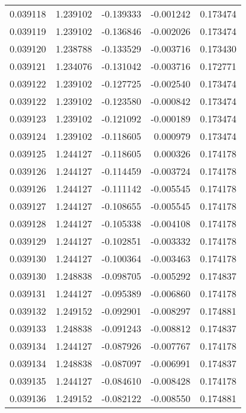 \begin{tabular}{lrrrr}
0.039118    &  1.239102 & -0.139333 & -0.001242 &             0.173474 \\
0.039119    &  1.239102 & -0.136846 & -0.002026 &             0.173474 \\
0.039120    &  1.238788 & -0.133529 & -0.003716 &             0.173430 \\
0.039121    &  1.234076 & -0.131042 & -0.003716 &             0.172771 \\
0.039122    &  1.239102 & -0.127725 & -0.002540 &             0.173474 \\
0.039122    &  1.239102 & -0.123580 & -0.000842 &             0.173474 \\
0.039123    &  1.239102 & -0.121092 & -0.000189 &             0.173474 \\
0.039124    &  1.239102 & -0.118605 &  0.000979 &             0.173474 \\
0.039125    &  1.244127 & -0.118605 &  0.000326 &             0.174178 \\
0.039126    &  1.244127 & -0.114459 & -0.003724 &             0.174178 \\
0.039126    &  1.244127 & -0.111142 & -0.005545 &             0.174178 \\
0.039127    &  1.244127 & -0.108655 & -0.005545 &             0.174178 \\
0.039128    &  1.244127 & -0.105338 & -0.004108 &             0.174178 \\
0.039129    &  1.244127 & -0.102851 & -0.003332 &             0.174178 \\
0.039130    &  1.244127 & -0.100364 & -0.003463 &             0.174178 \\
0.039130    &  1.248838 & -0.098705 & -0.005292 &             0.174837 \\
0.039131    &  1.244127 & -0.095389 & -0.006860 &             0.174178 \\
0.039132    &  1.249152 & -0.092901 & -0.008297 &             0.174881 \\
0.039133    &  1.248838 & -0.091243 & -0.008812 &             0.174837 \\
0.039134    &  1.244127 & -0.087926 & -0.007767 &             0.174178 \\
0.039134    &  1.248838 & -0.087097 & -0.006991 &             0.174837 \\
0.039135    &  1.244127 & -0.084610 & -0.008428 &             0.174178 \\
0.039136    &  1.249152 & -0.082122 & -0.008550 &             0.174881 \\

\end{tabular}
